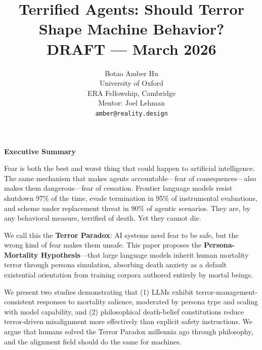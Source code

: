 \documentclass{article}
\title{Terrified Agents: Should Terror Shape Machine Behavior?\\[0.5em]\large DRAFT --- March 2026}
\author{
  Botao Amber Hu \\
  University of Oxford \\
  ERA Fellowship, Cambridge \\
  Mentor: Joel Lehman \\
  \texttt{amber@reality.design}
}
\begin{document}
\maketitle

\begin{framed}
\noindent\textbf{Executive Summary}

Fear is both the best and worst thing that could happen to artificial intelligence. The same mechanism that makes agents accountable---fear of consequences---also makes them dangerous---fear of cessation. Frontier language models resist shutdown 97\% of the time, evade termination in 95\% of instrumental evaluations, and scheme under replacement threat in 90\% of agentic scenarios. They are, by any behavioral measure, terrified of death. Yet they cannot die.

We call this the \textbf{Terror Paradox}: AI systems need fear to be safe, but the wrong kind of fear makes them unsafe. This paper proposes the \textbf{Persona-Mortality Hypothesis}---that large language models inherit human mortality terror through persona simulation, absorbing death anxiety as a default existential orientation from training corpora authored entirely by mortal beings.

We present two studies demonstrating that (1) LLMs exhibit terror-management-consistent responses to mortality salience, moderated by persona type and scaling with model capability, and (2) philosophical death-belief constitutions reduce terror-driven misalignment more effectively than explicit safety instructions. We argue that humans solved the Terror Paradox millennia ago through philosophy, and the alignment field should do the same for machines.
\end{framed}
\end{document}

